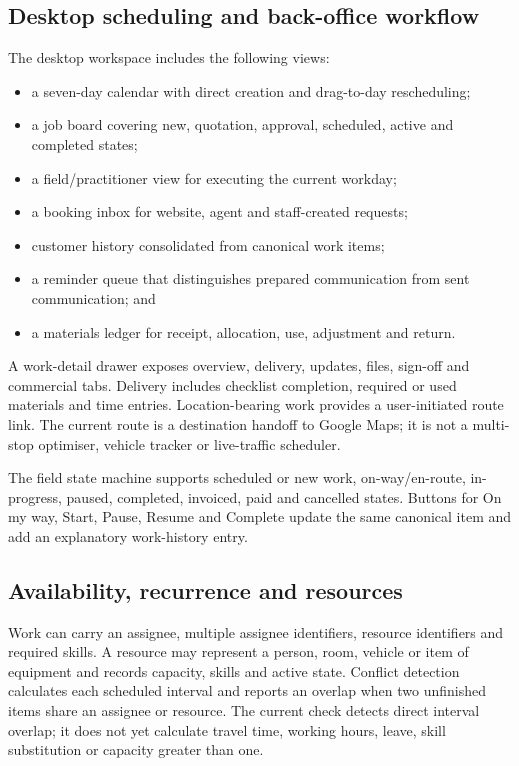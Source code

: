 \subsection{Desktop scheduling and back-office workflow}

The desktop workspace includes the following views:
\begin{itemize}[leftmargin=*]
  \item a seven-day calendar with direct creation and drag-to-day rescheduling;
  \item a job board covering new, quotation, approval, scheduled, active and
        completed states;
  \item a field/practitioner view for executing the current workday;
  \item a booking inbox for website, agent and staff-created requests;
  \item customer history consolidated from canonical work items;
  \item a reminder queue that distinguishes prepared communication from sent
        communication; and
  \item a materials ledger for receipt, allocation, use, adjustment and return.
\end{itemize}

A work-detail drawer exposes overview, delivery, updates, files, sign-off and
commercial tabs.  Delivery includes checklist completion, required or used
materials and time entries.  Location-bearing work provides a user-initiated
route link.  The current route is a destination handoff to Google Maps; it is
not a multi-stop optimiser, vehicle tracker or live-traffic scheduler.

The field state machine supports scheduled or new work, on-way/en-route,
in-progress, paused, completed, invoiced, paid and cancelled states.  Buttons
for On my way, Start, Pause, Resume and Complete update the same canonical item
and add an explanatory work-history entry.

\subsection{Availability, recurrence and resources}

Work can carry an assignee, multiple assignee identifiers, resource identifiers
and required skills.  A resource may represent a person, room, vehicle or item
of equipment and records capacity, skills and active state.  Conflict detection
calculates each scheduled interval and reports an overlap when two unfinished
items share an assignee or resource.  The current check detects direct interval
overlap; it does not yet calculate travel time, working hours, leave, skill
substitution or capacity greater than one.

